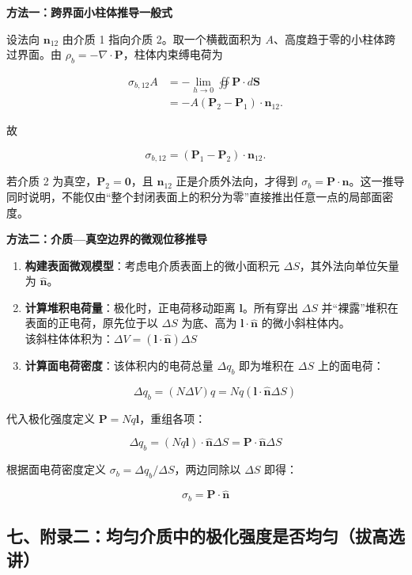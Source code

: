 \textbf{方法一：跨界面小柱体推导一般式}

设法向 \(\mathbf n_{12}\) 由介质 1 指向介质 2。取一个横截面积为
\(A\)、高度趋于零的小柱体跨过界面。由
\(\rho_b=-\nabla\cdot\mathbf P\)，柱体内束缚电荷为

\[
\begin{aligned}
\sigma_{b,12}A
&=-\lim_{h\to0}\oiint\mathbf P\cdot d\mathbf S\\
&=-A(\mathbf P_2-\mathbf P_1)\cdot\mathbf n_{12}.
\end{aligned}
\]

故

\[
\boxed{\sigma_{b,12}=(\mathbf P_1-\mathbf P_2)\cdot\mathbf n_{12}}.
\]

若介质 2 为真空，\(\mathbf P_2=\mathbf0\)，且 \(\mathbf n_{12}\)
正是介质外法向，才得到
\(\sigma_b=\mathbf P\cdot\mathbf n\)。这一推导同时说明，不能仅由``整个封闭表面上的积分为零''直接推出任意一点的局部面密度。

\textbf{方法二：介质---真空边界的微观位移推导}

\begin{enumerate}
\def\labelenumi{\arabic{enumi}.}
\item
  \textbf{构建表面微观模型}：考虑电介质表面上的微小面积元
  \(\Delta S\)，其外法向单位矢量为 \(\mathbf{\hat{n}}\)。
\item
  \textbf{计算堆积电荷量}：极化时，正电荷移动距离
  \(\mathbf{l}\)。所有穿出 \(\Delta S\)
  并``裸露''堆积在表面的正电荷，原先位于以 \(\Delta S\) 为底、高为
  \(\mathbf{l} \cdot \mathbf{\hat{n}}\) 的微小斜柱体内。\\
  该斜柱体体积为：\(\Delta V = (\mathbf{l} \cdot \mathbf{\hat{n}}) \Delta S\)
\item
  \textbf{计算面电荷密度}：该体积内的电荷总量 \(\Delta q_b\) 即为堆积在
  \(\Delta S\) 上的面电荷：

  \[
  \Delta q_b = (N \Delta V) q = N q (\mathbf{l} \cdot \mathbf{\hat{n}} \Delta S)
  \]
\end{enumerate}

代入极化强度定义 \(\mathbf{P} = Nq\mathbf{l}\)，重组各项：

\[
\Delta q_b = (Nq\mathbf{l}) \cdot \mathbf{\hat{n}} \Delta S = \mathbf{P} \cdot \mathbf{\hat{n}} \Delta S
\]

根据面电荷密度定义 \(\sigma_b=\Delta q_b/\Delta S\)，两边同除以
\(\Delta S\) 即得：

\[
\sigma_b = \mathbf{P} \cdot \mathbf{\hat{n}}
\]

\subsection{七、附录二：均匀介质中的极化强度是否均匀（拔高选讲）}\label{m3:ux4e03ux9644ux5f55ux4e8cux5747ux5300ux4ecbux8d28ux4e2dux7684ux6781ux5316ux5f3aux5ea6ux662fux5426ux5747ux5300ux62d4ux9ad8ux9009ux8bb2}

